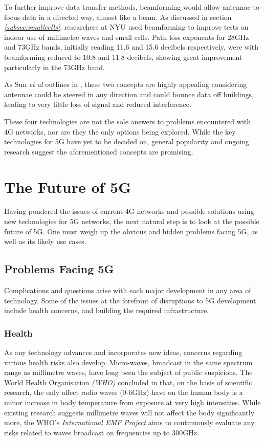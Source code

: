 \documentclass[journal]{IEEEtran}
\begin{document}
To further improve data transfer methods, beamforming would allow antennae to focus data in a directed way, almost like a beam. As discussed in section \textit{\ref{subsec:smallcells}}, researchers at NYU used beamforming to improve tests on indoor use of millimetre waves and small cells. Path loss exponents for 28GHz and 73GHz bands, initially reading 11.6 and 15.6 decibels respectively, were with beamforming reduced to 10.8 and 11.8 decibels, showing great improvement particularly in the 73GHz band.

As Sun \textit{et al} outlines in \cite{beam_sm}, these two concepts are highly appealing considering antennae could be steered in any direction and could bounce data off buildings, leading to very little loss of signal and reduced interference.
\bigskip

These four technologies are not the sole answers to problems encountered with 4G networks, nor are they the only options being explored. While the key technologies for 5G have yet to be decided on, general popularity and ongoing research suggest the aforementioned concepts are promising.

\section{The Future of 5G}
Having pondered the issues of current 4G networks and possible solutions using new technologies for 5G networks, the next natural step is to look at the possible future of 5G. One must weigh up the obvious and hidden problems facing 5G, as well as its likely use cases.

\subsection{Problems Facing 5G}
Complications and questions arise with each major development in any area of technology. Some of the issues at the forefront of disruptions to 5G development include health concerns, and building the required infrastructure.


\subsubsection{Health}
As any technology advances and incorporates new ideas, concerns regarding various health risks also develop. Micro-waves, broadcast in the same spectrum range as millimetre waves, have long been the subject of public suspicions. The World Health Organisation \textit{(WHO)} concluded in \cite{health} that, on the basis of scientific research, the only affect radio waves (0-6GHz) have on the human body is a minor increase in body temperature from exposure at very high intensities. While existing research suggests millimetre waves will not affect the body significantly more, the WHO's \textit{International EMF Project} \cite{emfproj} aims to continuously evaluate any risks related to waves broadcast on frequencies up to 300GHz.
\end{document}
